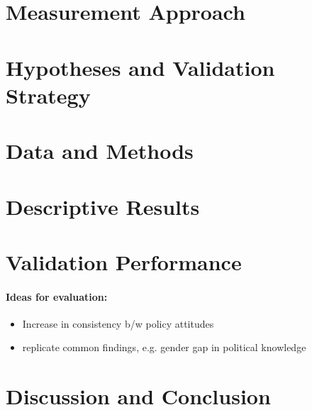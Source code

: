 \documentclass[12pt]{article}
\begin{document}
\section{Measurement Approach}

\section{Hypotheses and Validation Strategy}


\section{Data and Methods}

\section{Descriptive Results}

\section{Validation Performance}

\paragraph{Ideas for evaluation:}
\begin{itemize}\singlespacing
\item Increase in consistency b/w policy attitudes \citep[e.g.][]{prior2014visual}
\item replicate common findings, e.g. gender gap in political knowledge \citep[e.g.][]{barabas2014question}
\end{itemize}

\section{Discussion and Conclusion}


\clearpage


\end{document}
